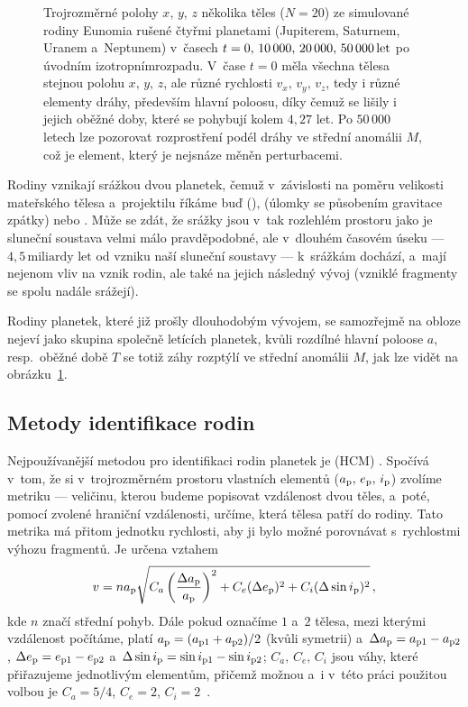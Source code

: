\documentclass[A4paper, 12pt, oneside]{book}
\begin{document}
\begin{figure}
	\caption{Trojrozměrné polohy $x,\,y,\,z$ několika těles ($N=20$) ze simulované rodiny Eunomia rušené čtyřmi planetami (Jupiterem, Saturnem, Uranem a~Neptunem) v~časech $t=0,\,10\,000,\,20\,000,\,50\,000\,{\rm let}$ po úvodním izotropním\protect\footnotemark rozpadu. V~čase $t=0$ měla všechna tělesa stejnou polohu $x,\,y,\,z$, ale různé rychlosti $v_x,\,v_y,\,v_z$, tedy i různé elementy dráhy, především hlavní poloosu, díky čemuž se lišily i jejich oběžné doby, které se pohybují kolem $4,27$ let. Po $50\,000$ letech lze pozorovat rozprostření podél dráhy ve střední anomálii $M$, což je element, který je nejsnáze měněn perturbacemi.} \label{fig:trajec}
\end{figure}

Rodiny vznikají srážkou dvou planetek, čemuž v~závislosti na poměru velikosti mateřského tělesa a~projektilu říkáme buď  (),  (úlomky se působením gravitace  zpátky) nebo . Může se zdát, že srážky jsou v~tak rozlehlém prostoru jako je sluneční soustava velmi málo pravděpodobné, ale v~dlouhém časovém úseku --- $4,5\,\text{miliardy let}$ od vzniku naší sluneční soustavy --- k~srážkám dochází, a~mají nejenom vliv na vznik rodin, ale také na jejich následný vývoj (vzniklé fragmenty se spolu nadále srážejí).

Rodiny planetek, které již prošly dlouhodobým vývojem, se samozřejmě na obloze nejeví jako skupina společně letících planetek, kvůli rozdílné hlavní poloose $a$, resp.\ oběžné době $T$ se totiž záhy rozptýlí ve střední anomálii $M$, jak lze vidět na obrázku~\ref{fig:trajec}.

\subsection{Metody identifikace rodin} \label{sec:metodyiden}
Nejpoužívanější metodou pro identifikaci rodin planetek je  (HCM) \cite{zappala90}. Spočívá v~tom, že si v~trojrozměrném prostoru vlastních elementů ($a_{\rm p},\,e_{\rm p},\,i_{\rm p}$) zvolíme metriku --- veličinu, kterou budeme popisovat vzdálenost dvou těles, a~poté, pomocí zvolené hraniční  vzdálenosti, určíme, která tělesa patří do rodiny. Tato metrika má přitom jednotku rychlosti, aby ji bylo možné porovnávat s~rychlostmi výhozu fragmentů. Je určena vztahem
\begin{align}
	v=na_{\rm p}\sqrt{C_a\left(\frac{\Delta a_{\rm p}}{a_{\rm p}}\right)^2+C_e(\Delta e_{\rm p})^2+C_i(\Delta \sin i_{\rm p})^2}\,,
\end{align}
kde $n$ značí střední pohyb. Dále pokud označíme $1$ a~$2$ tělesa, mezi kterými vzdálenost počítáme, platí $a_{\rm p}=(a_{{\rm p}1}+a_{{\rm p}2})/2$ (kvůli symetrii) a~$\Delta a_{\rm p}=a_{{\rm p}1}-a_{{\rm p}2}$, $\Delta e_{\rm p}=e_{{\rm p}1}-e_{{\rm p}2}$ a~$\Delta \sin i_{\rm p}=\sin i_{{\rm p}1}-\sin i_{{\rm p}2}$; $C_a,\,C_e,\,C_i$ jsou váhy, které přiřazujeme jednotlivým elementům, přičemž možnou a~i v~této práci použitou volbou je $C_a=5/4$, $C_e=2$, $C_i=2$~\cite{zappala90}. 
\end{document}
